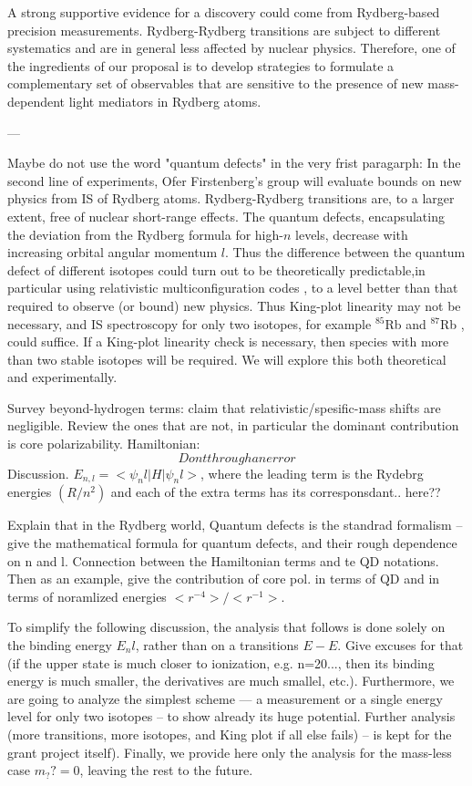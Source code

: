 \documentclass[a4paper,12pt]{article}
\begin{document}
\vskip 1.5cm

A strong supportive evidence for a discovery could come from Rydberg-based precision measurements.
Rydberg-Rydberg transitions are subject to different systematics and are in general less affected by nuclear physics.
Therefore, one of the ingredients of our proposal is to develop strategies to formulate a complementary set of observables that are sensitive to the presence of new mass-dependent light mediators in Rydberg atoms.

---


Maybe do not use the word "quantum defects" in the very frist paragarph:
In the second line of experiments, Ofer Firstenberg's group will evaluate bounds on new physics from IS of Rydberg atoms.
Rydberg-Rydberg transitions are, to a larger extent, free of nuclear short-range effects.
The quantum defects, encapsulating the deviation from the Rydberg formula for high-$n$ levels, decrease with increasing orbital angular momentum $l$.
Thus the difference between the quantum defect of different isotopes could turn out to be theoretically predictable,in particular using relativistic multiconfiguration codes \cite{Grant:2013}, to a level better than that required to observe (or bound) new physics.
Thus King-plot linearity may not be necessary, and IS spectroscopy for only two isotopes, for example $^{85}$Rb and $^{87}$Rb \cite{Fortagh:2011pra}, could suffice.
If a King-plot linearity check is necessary, then species with more than two stable isotopes will be required.
We will explore this both theoretical and experimentally.

Survey beyond-hydrogen terms: claim that relativistic/spesific-mass shifts are negligible.
Review the ones that are not, in particular the dominant contribution is core polarizability.
Hamiltonian:
\begin{equation}
Dont through an error
\end{equation}
Discussion. $E_{n,l}= <\psi_nl|H|\psi_nl>$, where the leading term is the Rydebrg energies $(R/n^2)$ and each of the extra terms has its corresponsdant.. here??

Explain that in the Rydberg world, Quantum defects is the standrad formalism -- give the mathematical formula for quantum defects, and their rough dependence on n and l.
Connection between the Hamiltonian terms and te QD notations.
Then as an example, give the contribution of core pol. in terms of QD and in terms of noramlized energies $<r^{-4}>/<r^{-1}>$.

To simplify the following discussion, the analysis that follows is done solely on the binding energy $E_nl$, rather than on a transitions $E-E$.
Give excuses for that (if the upper state is much closer to ionization, e.g. n=20..., then its binding energy is much smaller, the derivatives are much smallel, etc.).
Furthermore, we are going to analyze the simplest scheme --- a measurement or a single energy level for only two isotopes -- to show already its huge potential.
Further analysis (more transitions, more isotopes, and King plot if all else fails) -- is kept for the grant project itself).
Finally, we provide here only the analysis for the mass-less case $m_??=0$, leaving the rest to the future.
\end{document}

